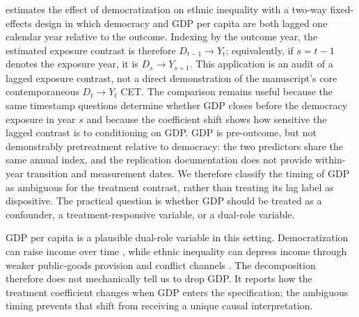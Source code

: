 \documentclass[
]{article}
\begin{document}
\citet{leipziger2024} estimates the effect of democratization on ethnic
inequality with a two-way fixed-effects design in which democracy and
GDP per capita are both lagged one calendar year relative to the
outcome. Indexing by the outcome year, the estimated exposure contrast
is therefore \(D_{t-1}\rightarrow Y_t\); equivalently, if \(s=t-1\)
denotes the exposure year, it is \(D_s\rightarrow Y_{s+1}\). This
application is an audit of a lagged exposure contrast, not a direct
demonstration of the manuscript's core contemporaneous
\(D_t\rightarrow Y_t\) CET. The comparison remains useful because the
same timestamp questions determine whether GDP closes before the
democracy exposure in year \(s\) and because the coefficient shift shows
how sensitive the lagged contrast is to conditioning on GDP. GDP is
pre-outcome, but not demonstrably pretreatment relative to democracy:
the two predictors share the same annual index, and the replication
documentation does not provide within-year transition and measurement
dates. We therefore classify the timing of GDP as ambiguous for the
treatment contrast, rather than treating its lag label as dispositive.
The practical question is whether GDP should be treated as a confounder,
a treatment-responsive variable, or a dual-role variable.

GDP per capita is a plausible dual-role variable in this setting.
Democratization can raise income over time
\citep{acemoglu_etal2019, papaioannou_siourounis2008}, while ethnic
inequality can depress income through weaker public-goods provision and
conflict channels \citep{grundler_link2024}. The decomposition therefore
does not mechanically tell us to drop GDP. It reports how the treatment
coefficient changes when GDP enters the specification; the ambiguous
timing prevents that shift from receiving a unique causal
interpretation.

\begin{table}[!h]
\centering
\caption{\label{tab:leipziger-ivb-table}Specification-shift decomposition for Leipziger (2024), public-services inequality measure.}
\centering
{}
\end{table}
\end{document}

